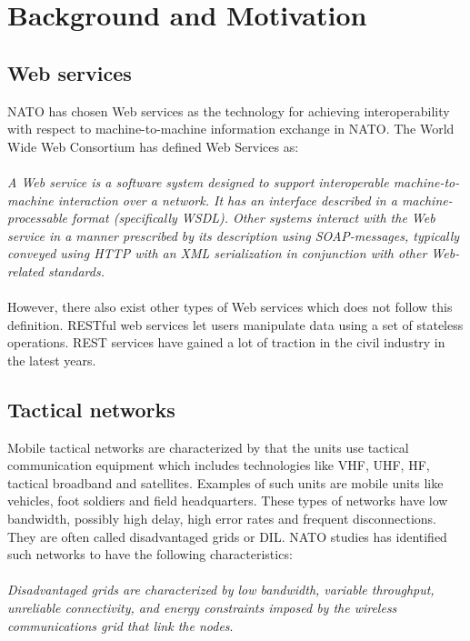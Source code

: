 \documentclass[USenglish]{article}
\begin{document}
\section{Background and Motivation}

\subsection{Web services}
NATO has chosen Web services as the technology for achieving interoperability with respect to machine-to-machine information exchange in NATO. The World Wide Web Consortium has defined Web Services as\cite{wrc-web-service}:
\paragraph{}
\textit{A Web service is a software system designed to support interoperable machine-to-machine interaction over a network. It has an interface described in a machine-processable format (specifically WSDL). Other systems interact with the Web service in a manner prescribed by its description using SOAP-messages, typically conveyed using HTTP with an XML serialization in conjunction with other Web-related standards.}
\paragraph{}
However, there also exist other types of Web services which does not follow this definition. RESTful web services let users manipulate data using a set of stateless operations. REST services have gained a lot of traction in the civil industry in the latest years.


\subsection{Tactical networks}
Mobile tactical networks are characterized by that the units use tactical
communication equipment which includes technologies like VHF, UHF, HF, tactical
broadband and satellites. Examples of such units are mobile units like vehicles,
foot soldiers and field headquarters. These types of networks have low
bandwidth, possibly high delay, high error rates and frequent disconnections.
They are often called disadvantaged grids or DIL. NATO studies has
identified such networks to have the following characteristics:

\paragraph{}
\textit{Disadvantaged grids are characterized by low bandwidth, variable
throughput, unreliable connectivity, and energy constraints imposed by the
wireless communications grid that link the
nodes}\cite{nato-disadvantaged-grids}.
\end{document}
